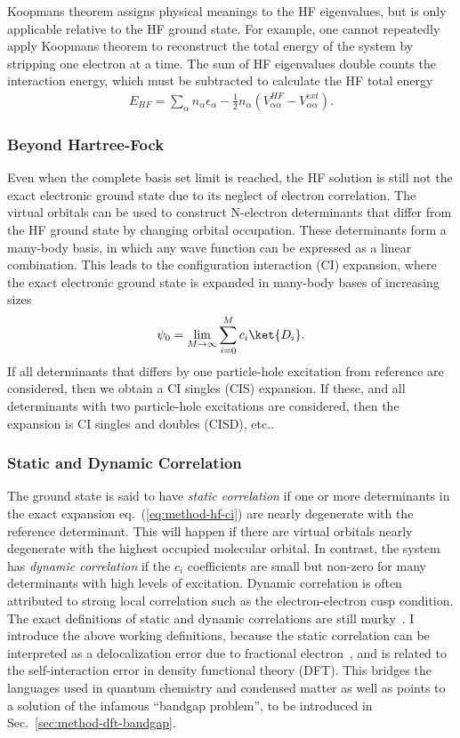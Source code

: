 Koopmans theorem assigns physical meanings to the HF eigenvalues, but is only applicable relative to the HF ground state. For example, one cannot repeatedly apply Koopmans theorem to reconstruct the total energy of the system by stripping one electron at a time. The sum of HF eigenvalues double counts the interaction energy, which must be subtracted to calculate the HF total energy
\begin{align}
E_{HF} = \sum\limits_{\alpha} n_\alpha \epsilon_\alpha - \frac{1}{2}n_\alpha (V_{\alpha\alpha}^{HF}-V_{\alpha\alpha}^{ext}).
\end{align}

\subsubsection{Beyond Hartree-Fock}
Even when the complete basis set limit is reached, the HF solution is still not the exact electronic ground state due to its neglect of electron correlation.
The virtual orbitals can be used to construct N-electron determinants that differ from the HF ground state by changing orbital occupation.
These determinants form a many-body basis, in which any wave function can be expressed as a linear combination.
This leads to the configuration interaction (CI) expansion, where the exact electronic ground state is expanded in many-body bases of increasing sizes
\begin{align} \label{eq:method-hf-ci}
\psi_0 = \lim\limits_{M\rightarrow\infty}\sum\limits_{i=0}^{M} c_i \ket{D_i}.
\end{align}
If all determinants that differs by one particle-hole excitation from reference are considered, then we obtain a CI singles (CIS) expansion. If these, and all determinants with two particle-hole excitations are considered, then the expansion is CI singles and doubles (CISD), etc..

\subsubsection{Static and Dynamic Correlation}
The ground state is said to have \textit{static correlation} if one or more determinants in the exact expansion eq.~(\ref{eq:method-hf-ci}) are nearly degenerate with the reference determinant.
This will happen if there are virtual orbitals nearly degenerate with the highest occupied molecular orbital.
In contrast, the system has \textit{dynamic correlation} if the $c_i$ coefficients are small but non-zero for many determinants with high levels of excitation.
Dynamic correlation is often attributed to strong local correlation such as the electron-electron cusp condition.
The exact definitions of static and dynamic correlations are still murky~\cite{Benavides-Riveros2017}.
I introduce the above working definitions, because the static correlation can be interpreted as a delocalization error due to fractional electron~\cite{Cohen2008}, and is related to the self-interaction error in density functional theory (DFT).
This bridges the languages used in quantum chemistry and condensed matter as well as points to a solution of the infamous ``bandgap problem'', to be introduced in  Sec.~\ref{sec:method-dft-bandgap}.

